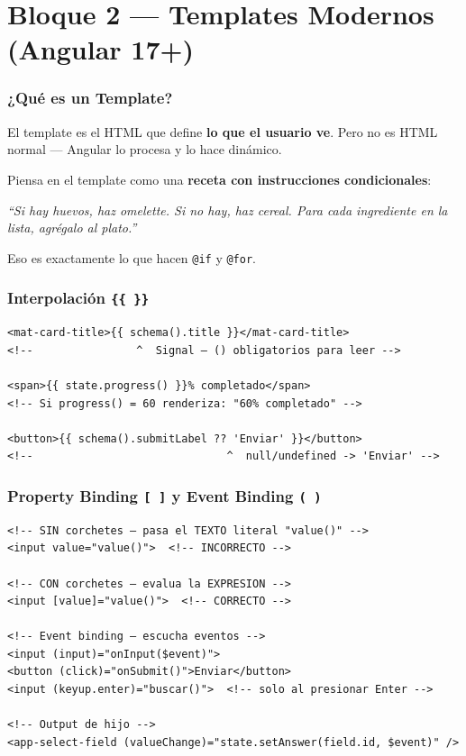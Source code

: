 \documentclass[12pt, a4paper]{article}
\begin{document}
\part{ Bloque 2 — Templates Modernos (Angular 17+)}

\section{  ¿Qué es un Template?}

El template es el HTML que define \textbf{lo que el usuario ve}.
Pero no es HTML normal --- Angular lo procesa y lo hace dinámico.

\begin{tcolorbox}[analogia, title={\emoji{cook} \emoji{memo} La Receta con Instrucciones}]
Piensa en el template como una \textbf{receta con instrucciones condicionales}:

\textit{``Si hay huevos, haz omelette. Si no hay, haz cereal.
Para cada ingrediente en la lista, agrégalo al plato.''}

Eso es exactamente lo que hacen \texttt{@if} y \texttt{@for}.
\end{tcolorbox}

\section{  Interpolación \texttt{\{\{ \}\}}}

\begin{lstlisting}
<mat-card-title>{{ schema().title }}</mat-card-title>
<!--                ^  Signal — () obligatorios para leer -->

<span>{{ state.progress() }}% completado</span>
<!-- Si progress() = 60 renderiza: "60% completado" -->

<button>{{ schema().submitLabel ?? 'Enviar' }}</button>
<!--                              ^  null/undefined -> 'Enviar' -->
\end{lstlisting}

\section{  Property Binding \texttt{[ ]} y Event Binding \texttt{( )}}

\begin{lstlisting}
<!-- SIN corchetes — pasa el TEXTO literal "value()" -->
<input value="value()">  <!-- INCORRECTO -->

<!-- CON corchetes — evalua la EXPRESION -->
<input [value]="value()">  <!-- CORRECTO -->

<!-- Event binding — escucha eventos -->
<input (input)="onInput($event)">
<button (click)="onSubmit()">Enviar</button>
<input (keyup.enter)="buscar()">  <!-- solo al presionar Enter -->

<!-- Output de hijo -->
<app-select-field (valueChange)="state.setAnswer(field.id, $event)" />
\end{lstlisting}
\end{document}
